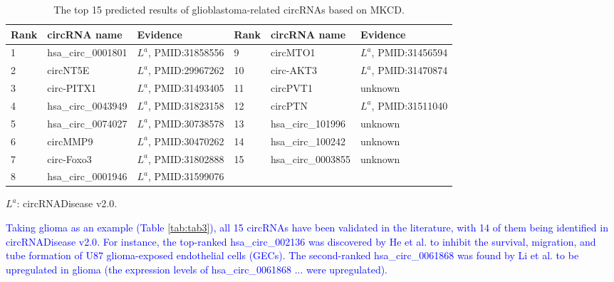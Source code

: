 \documentclass{bioinfo}
\begin{document}
\begin{methods}
\begin{table}[!t]
	\label{tab:05}
    \centering
    \begin{threeparttable}[b]  
        \caption{The top 15 predicted results of glioblastoma-related circRNAs based on MKCD.}	\label{tab:tab5}
        \vspace{0.4cm}
        \setlength{\tabcolsep}{0pt}  %
        \begin{tabular}{p{2cm}<{\centering} p{3.9cm}<{\raggedright} p{4.5cm}<{\raggedright} | p{2cm}<{\centering} p{3.9cm}<{\raggedright} p{4.2cm}<{\raggedright}}
            \hline
            \textbf{Rank} &  \textbf{circRNA name} & \textbf{Evidence} & \textbf{Rank} &  \textbf{circRNA name} & \textbf{Evidence} \\
            \hline
            1 & hsa\_circ\_0001801 & $L^a$, PMID:31858556 & 9 & circMTO1 & $L^a$, PMID:31456594 \\
            2 & circNT5E & $L^a$, PMID:29967262 & 10 & circ-AKT3 & $L^a$, PMID:31470874 \\
            3 & circ-PITX1 & $L^a$, PMID:31493405 & 11 & circPVT1 & unknown \\
            4 & hsa\_circ\_0043949 & $L^a$, PMID:31823158 & 12 & circPTN & $L^a$, PMID:31511040 \\
            5 & hsa\_circ\_0074027 & $L^a$, PMID:30738578 & 13 & hsa\_circ\_101996 & unknown \\
            6 & circMMP9 & $L^a$, PMID:30470262 & 14 & hsa\_circ\_100242 & unknown \\
            7 & circ-Foxo3 & $L^a$, PMID:31802888 & 15 & hsa\_circ\_0003855 & unknown \\
            8 & hsa\_circ\_0001946 & $L^a$, PMID:31599076 & & & \\
            \hline
        \end{tabular}
        \begin{tablenotes}
            \item $L^a$: circRNADisease v2.0.
        \end{tablenotes}
    \end{threeparttable}
    \vspace{-0.4cm}
\end{table}

\textcolor{blue}{Taking glioma as an example (Table \ref{tab:tab3}), all 15 circRNAs have been validated in the literature, \textcolor{blue}{with 14 of them being identified in circRNADisease v2.0}. For instance, the top-ranked hsa\_circ\_002136 was discovered by He et al. \cite{he2019fus} to inhibit the survival, migration, and tube formation of U87 glioma-exposed endothelial cells (GECs). The second-ranked hsa\_circ\_0061868 was found by Li et al. \cite{li2019circ} to be upregulated in glioma (the expression levels of hsa\_circ\_0061868 ... were upregulated).}


\end{methods}
\end{document}

